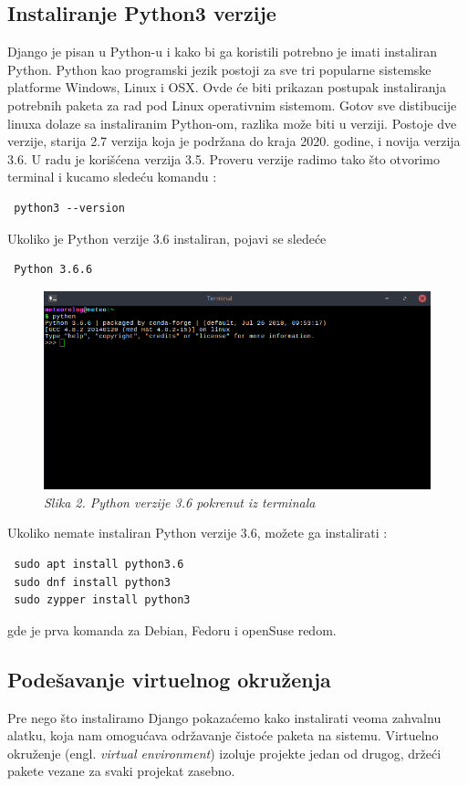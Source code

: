 \documentclass[12pt]{article}
\begin{document}
\subsection{Instaliranje Python3 verzije }
Django je pisan u Python-u i kako bi ga koristili potrebno je imati instaliran Python. Python kao programski jezik postoji za sve tri popularne sistemske platforme Windows, Linux i OSX. Ovde će biti prikazan postupak instaliranja potrebnih paketa za rad pod Linux operativnim sistemom. Gotov sve distibucije linuxa dolaze sa instaliranim Python-om, razlika može biti u verziji. Postoje dve verzije, starija 2.7 verzija koja je podržana do kraja 2020. godine, i novija verzija 3.6. U radu je korišćena verzija 3.5. Proveru verzije radimo tako što otvorimo terminal i kucamo sledeću komandu : 
\begin{lstlisting}
 python3 --version
\end{lstlisting}
Ukoliko je Python verzije 3.6 instaliran, pojavi se sledeće
\begin{lstlisting}
 Python 3.6.6
\end{lstlisting}
\begin{figure}[h!]
\centering
\includegraphics[width=1.\linewidth]{python.png}
\caption*{\textsl{Slika 2. Python verzije 3.6 pokrenut iz terminala}}
\end{figure}
Ukoliko nemate instaliran Python verzije 3.6, možete ga instalirati :
\begin{lstlisting}
 sudo apt install python3.6
 sudo dnf install python3
 sudo zypper install python3
\end{lstlisting}
gde je prva komanda za Debian, Fedoru i openSuse redom.
\subsection{Podešavanje virtuelnog okruženja}
Pre nego što instaliramo Django pokazaćemo kako instalirati veoma zahvalnu alatku, koja nam omogućava održavanje čistoće paketa na sistemu. Virtuelno okruženje (engl. \textsl{virtual environment}) izoluje projekte jedan od drugog, držeći pakete vezane za svaki projekat zasebno. 
\end{document}

